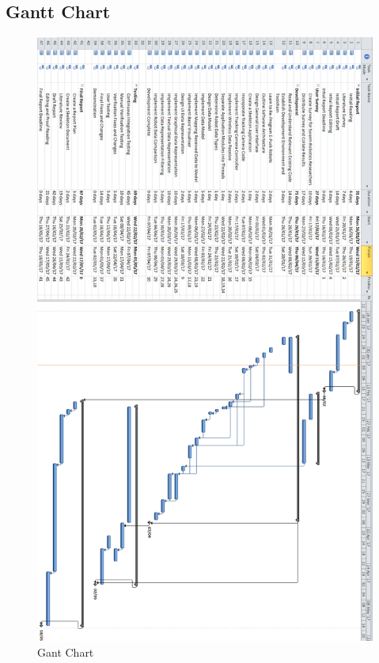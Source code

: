 \documentclass[titlepage,hidelinks,10pt]{article}
\begin{document}
\begin{appendix}
\section{Gantt Chart}\label{app:GantChart}
\begin{figure}[H]
	\begin{center}
	\includegraphics[scale=0.5]{Gant90.png}
	\caption{Gant Chart}
	\label{fig:GantChart}
	\end{center}
\end{figure}

\end{appendix}
\end{document}
